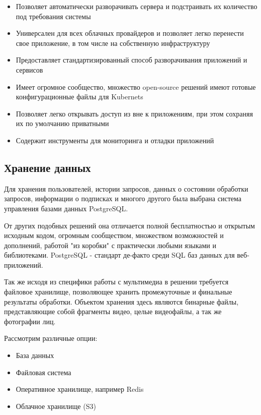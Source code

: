 \begin{itemize}
	\item Позволяет автоматически разворачивать сервера и подстраивать их количество под требования системы
	\item Универсален для всех облачных провайдеров и позволяет легко перенести свое приложение, в том числе на собственную инфраструктуру
	\item Предоставляет стандартизированный способ разворачивания приложений и сервисов
	\item Имеет огромное сообщество, множество open-source решений имеют готовые конфигурационные файлы для Kubernets
	\item Позволяет легко открывать доступ из вне к приложениям, при этом сохраняя их по умолчанию приватными
	\item Содержит инструменты для мониторинга и отладки приложений
\end{itemize}

\subsection{Хранение данных}

Для хранения пользователей, истории запросов, данных о состоянии обработки запросов, информации о подписках и многого другого была выбрана система управления базами данных PostgreSQL.

От других подобных решений она отличается полной бесплатностью и открытым исходным кодом, огромным сообществом, множеством возможностей и дополнений, работой "из коробки" с практически любыми языками и библиотеками. PostgreSQL - стандарт де-факто среди SQL баз данных для веб-приложений.

Так же исходя из специфики работы с мультимедиа в решении требуется файловое хранилище, позволяющее хранить промежуточные и финальные результаты обработки. Объектом хранения здесь являются бинарные файлы, представляющие собой фрагменты видео, целые видеофайлы, а так же фотографии лиц.

Рассмотрим различные опции:

\begin{itemize}
	\item База данных
	\item Файловая система
	\item Оперативное хранилище, например Redis
	\item Облачное хранилище (S3)
\end{itemize}

